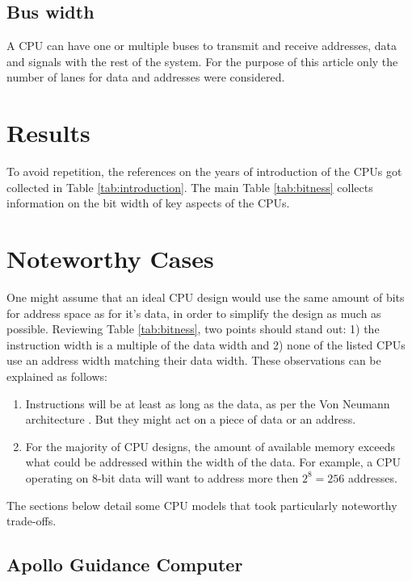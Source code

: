 \documentclass[twoside,twocolumn]{article}
\begin{document}
\subsection{Bus width}

A CPU can have one or multiple buses to transmit and receive addresses, data and signals
with the rest of the system. For the purpose of this article only the number of lanes for
data and addresses were considered.


\section{Results}

To avoid repetition, the references on the years of introduction of the CPUs got
collected in Table \ref{tab:introduction}. The main Table \ref{tab:bitness} collects
information on the bit width of key aspects of the CPUs.


\section{Noteworthy Cases}

One might assume that an ideal CPU design would use the same amount of bits for address
space as for it's data, in order to simplify the design as much as possible. Reviewing
Table \ref{tab:bitness}, two points should stand out: 1) the instruction width is a
multiple of the data width and 2) none of the listed CPUs use an address width matching
their data width. These observations can be explained as follows:

\begin{enumerate}[1)]
\item Instructions will be at least as long as the data, as per the Von Neumann
architecture \cite{edvac}. But they might act on a piece of data or an address.
\item For the majority of CPU designs, the amount of available memory exceeds what could
be addressed within the width of the data. For example, a CPU operating on 8-bit data
will want to address more then $2^8 = 256$ addresses.
\end{enumerate}

The sections below detail some CPU models that took particularly noteworthy trade-offs.

\subsection{Apollo Guidance Computer}
\end{document}
